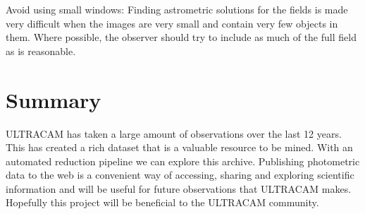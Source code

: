 {Avoid using small windows}: Finding astrometric solutions for the fields is made very difficult when the images are very small and contain very few objects in them. Where possible, the observer should try to include as much of the full field as is reasonable. 

\section{Summary}
ULTRACAM has taken a large amount of observations over the last 12 years. This has created a rich dataset that is a valuable resource to be mined. With an automated reduction pipeline we can explore this archive. Publishing photometric data to the web is a convenient way of accessing, sharing and exploring scientific information and will be useful for future observations that ULTRACAM makes. Hopefully this project will be beneficial to the ULTRACAM community. 
